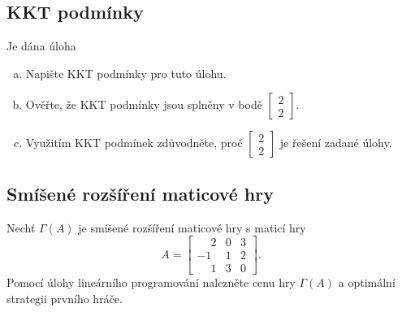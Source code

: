 \subsection{KKT podmínky}
Je dána úloha
\begin{enumerate}[(a)]
    \item Napište KKT podmínky pro tuto úlohu.
    \item Ověřte, že KKT podmínky jsou splněny v bodě $\begin{bmatrix}2 \\ 2\end{bmatrix}$.
    \item Využitím KKT podmínek zdůvodněte, proč $\begin{bmatrix}2 \\ 2\end{bmatrix}$ je řešení zadané úlohy.
\end{enumerate}

\subsection{Smíšené rozšíření maticové hry}
Nechť $\Gamma(A)$ je smíšené rozšíření maticové hry s maticí hry
\[
    A = 
    \begin{bmatrix}
        \phantom{-}2 & 0 & 3 \\
        -1 & 1 & 2 \\
        \phantom{-}1 & 3 & 0
    \end{bmatrix}.
\]
Pomocí úlohy lineárního programování nalezněte cenu hry $\Gamma(A)$ a optimální strategii prvního hráče.